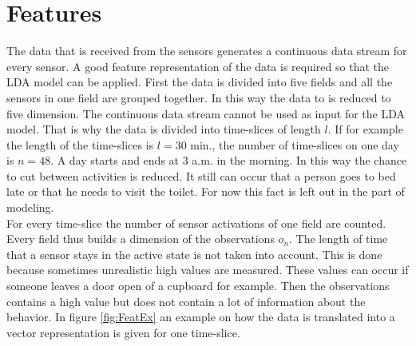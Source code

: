 \documentclass[11pt,a4paper]{article}
\begin{document}
\section{Features}
\label{sec:features}
The data that is received from the sensors generates a continuous data stream for every sensor. A good feature representation of the data is required so that the LDA model can be applied.
First the data is divided into five fields and all the sensors in one field are grouped together. In this way the data to is reduced to five dimension. The continuous data stream cannot be used as input for the LDA model. That is why the data is divided into time-slices of length $l$. If for example the length of the time-slices is $l=30$ min., the number of time-slices on one day is $n=48$.
A day starts and ends at 3 a.m. in the morning. In this way the chance to cut between activities is reduced. It still can occur that a person goes to bed late or that he needs to visit the toilet. For now this fact is left out in the part of modeling.\\

For every time-slice the number of sensor activations of one field are counted. Every field thus builds a dimension of the observations $o_n$. The length of time that a sensor stays in the active state is not taken into account. This is done because sometimes unrealistic high values are measured. These values can occur if someone leaves a door open of a cupboard for example. Then the observations contains a high value but does not contain a lot of information about the behavior. In figure \ref{fig:FeatEx} an example on how the data is translated into a vector representation is given for one time-slice.
\end{document}
